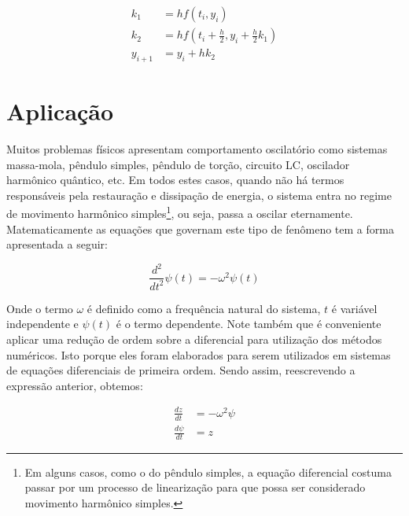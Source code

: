 \documentclass[
		12pt,            %
		a4paper
	      ]  
	      {article}          %
\begin{document}
	\vspace{-5mm}
	\begin{equation}\label{eq:rk2}
		\begin{aligned}
			k_1 &= hf(t_i,y_i)\\
			k_2 &= hf\left (t_i+\frac{h}{2}, y_i + \frac{h}{2} k_1 \right )\\
			y_{i+1} &= y_i + hk_2
		\end{aligned}
	\end{equation}
	\vspace{-5mm}

	\section{Aplicação}
	
	Muitos problemas físicos apresentam comportamento oscilatório como sistemas massa-mola, pêndulo simples,
	pêndulo de torção, circuito LC, oscilador harmônico quântico, etc. Em todos estes casos, quando não há  
	termos responsáveis pela restauração e dissipação de energia, o sistema entra no regime de movimento 
	harmônico simples\footnote{Em alguns casos, como o do pêndulo simples, a equação diferencial costuma passar
	por um processo de linearização para que possa ser considerado movimento harmônico simples.}, ou seja, 
	passa a oscilar eternamente. Matematicamente as equações que governam este tipo de fenômeno tem a forma 
	apresentada a seguir:

	\vspace{-5mm}
	\begin{equation}\label{eq:geral}
		\frac{d^2 }{dt^2} \psi(t) = - \omega^2 \psi(t)
	\end{equation}

	Onde o termo $\omega$ é definido como a frequência natural do sistema, $t$ é variável independente
	e $\psi(t)$ é o termo dependente. Note também que é conveniente aplicar uma redução de ordem sobre a 
	diferencial para utilização dos métodos numéricos. Isto porque eles foram elaborados para serem utilizados 
	em sistemas de equações diferenciais de primeira ordem. Sendo assim, reescrevendo a expressão anterior, 
	obtemos:

	\vspace{-5mm}
	\begin{equation}\label{eq:reduzida}
		\begin{aligned}			
			\frac{dz}{dt} &= - \omega^2 \psi \\
			\frac{d\psi}{dt} &= z
		\end{aligned}
	\end{equation}
	
\end{document}
